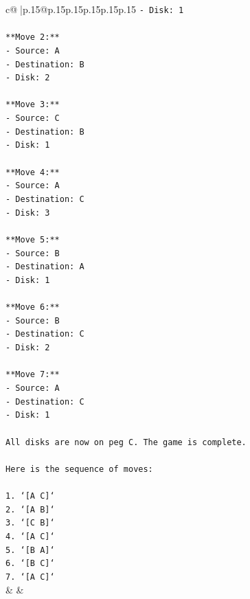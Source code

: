 \documentclass{article}
\begin{document}
{\begin{supertabular}{c@{$\;$}|p{.15\linewidth}@{}p{.15\linewidth}p{.15\linewidth}p{.15\linewidth}p{.15\linewidth}p{.15\linewidth}}
{{{\texttt{{-} Disk: 1} \\
\\ 
\texttt{**Move 2:**} \\
\texttt{{-} Source: A} \\
\texttt{{-} Destination: B} \\
\texttt{{-} Disk: 2} \\
\\ 
\texttt{**Move 3:**} \\
\texttt{{-} Source: C} \\
\texttt{{-} Destination: B} \\
\texttt{{-} Disk: 1} \\
\\ 
\texttt{**Move 4:**} \\
\texttt{{-} Source: A} \\
\texttt{{-} Destination: C} \\
\texttt{{-} Disk: 3} \\
\\ 
\texttt{**Move 5:**} \\
\texttt{{-} Source: B} \\
\texttt{{-} Destination: A} \\
\texttt{{-} Disk: 1} \\
\\ 
\texttt{**Move 6:**} \\
\texttt{{-} Source: B} \\
\texttt{{-} Destination: C} \\
\texttt{{-} Disk: 2} \\
\\ 
\texttt{**Move 7:**} \\
\texttt{{-} Source: A} \\
\texttt{{-} Destination: C} \\
\texttt{{-} Disk: 1} \\
\\ 
\texttt{All disks are now on peg C. The game is complete.} \\
\\ 
\texttt{Here is the sequence of moves:} \\
\\ 
\texttt{1.  `{[}A C{]}`} \\
\texttt{2.  `{[}A B{]}`} \\
\texttt{3.  `{[}C B{]}`} \\
\texttt{4.  `{[}A C{]}`} \\
\texttt{5.  `{[}B A{]}`} \\
\texttt{6.  `{[}B C{]}`} \\
\texttt{7.  `{[}A C{]}`} \\
            }
        }
    }
    & & \\ \\


\end{supertabular}}
\end{document}
